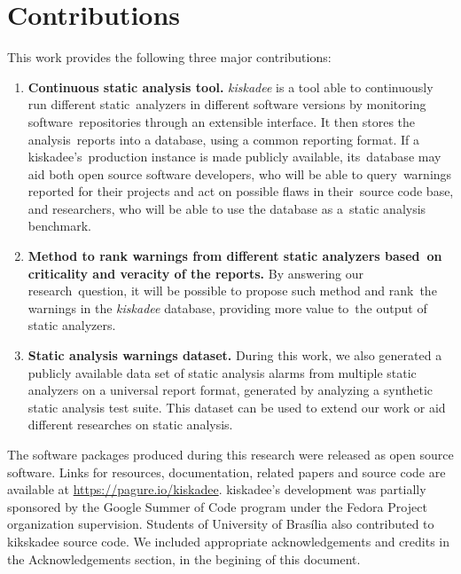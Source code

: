 \section{Contributions}
\label{sec:contributions}

This work provides the following three major contributions:

\begin{enumerate}[label=C\arabic*]
  \item \textbf{Continuous static analysis tool.}
    \textit{kiskadee} is a tool able to continuously run different static\
    analyzers in different software versions by monitoring software\
    repositories through an extensible interface. It then stores the analysis\
    reports into a database, using a common reporting format. If a kiskadee's\
    production instance is made publicly available, its\
    database may aid both open source software developers, who will be able to query\
    warnings reported for their projects and act on possible flaws in their\
    source code base, and researchers, who will be able to use the database as a\
    static analysis benchmark.

  \item \textbf{Method to rank warnings from different static analyzers based\
    on criticality and veracity of the reports.} By answering our research\
    question, it will be possible to propose such method and rank\
    the warnings in the \textit{kiskadee} database, providing more value to\
    the output of static analyzers.

  \item \textbf{Static analysis warnings dataset.} During this work, we also
    generated a publicly available data set of static analysis alarms from
    multiple static analyzers on a universal report format, generated by
    analyzing a synthetic static analysis test suite. This dataset can be used
    to extend our work or aid different researches on static analysis.

\end{enumerate}

The software packages produced during this research were released as open
source software. Links for resources, documentation, related papers and source
code are available at \url{https://pagure.io/kiskadee}. kiskadee's development
was partially sponsored by the Google Summer of Code program under the Fedora
Project organization supervision. Students of University of Brasília also
contributed to kikskadee source code. We included appropriate acknowledgements
and credits in the Acknowledgements section, in the begining of this document.

